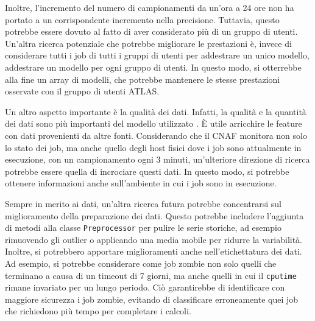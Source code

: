 Inoltre, l'incremento del numero di campionamenti da un'ora a 24 ore non ha
portato a un corrispondente incremento nella precisione. Tuttavia, questo
potrebbe essere dovuto al fatto di aver considerato più di un gruppo di
utenti. Un'altra ricerca potenziale che potrebbe migliorare le prestazioni è,
invece di considerare tutti i job di tutti i gruppi di utenti per addestrare
un unico modello, addestrare un modello per ogni gruppo di utenti. In questo
modo, si otterrebbe alla fine un array di modelli, che potrebbe mantenere le
stesse prestazioni osservate con il gruppo di utenti ATLAS.

Un altro aspetto importante è la qualità dei dati. Infatti, la qualità e la
quantità dei dati sono più importanti del modello utilizzato
\cite{halevy2009}. È utile arricchire le feature con dati provenienti da altre
fonti. Considerando che il CNAF monitora non solo lo stato dei job, ma anche
quello degli host fisici dove i job sono attualmente in esecuzione, con un
campionamento ogni 3 minuti, un'ulteriore direzione di ricerca potrebbe essere
quella di incrociare questi dati. In questo modo, si potrebbe ottenere
informazioni anche sull'ambiente in cui i job sono in esecuzione.

Sempre in merito ai dati, un'altra ricerca futura potrebbe concentrarsi sul
miglioramento della preparazione dei dati. Questo potrebbe includere
l'aggiunta di metodi alla classe \texttt{Preprocessor} per pulire le serie
storiche, ad esempio rimuovendo gli outlier o applicando una media mobile per
ridurre la variabilità. Inoltre, si potrebbero apportare miglioramenti anche
nell'etichettatura dei dati. Ad esempio, si potrebbe considerare come job
zombie non solo quelli che terminano a causa di un timeout di 7 giorni, ma
anche quelli in cui il \texttt{cputime} rimane invariato per un lungo periodo.
Ciò garantirebbe di identificare con maggiore sicurezza i job zombie, evitando
di classificare erroneamente quei job che richiedono più tempo per completare
i calcoli.
